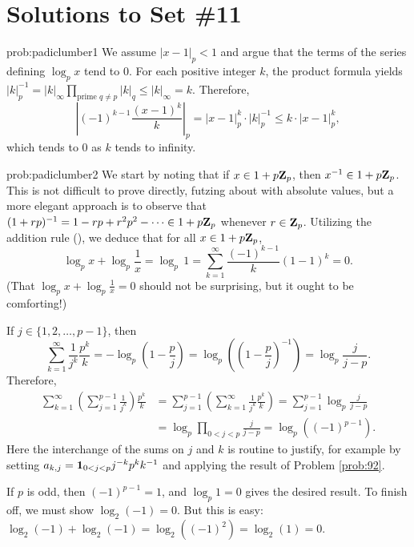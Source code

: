 \chapter*{Solutions to Set \#11}
\label{set10sols}

\begin{sol}{prob:padiclumber1} We assume $|x-1|_p < 1$ and argue that the terms of the series defining $\log_p x$ tend to $0$. For each positive integer $k$, the product formula yields $|k|_{p}^{-1} = |k|_\infty \prod_{\text{prime }q \ne p} |k|_{q} \le |k|_{\infty} = k$. Therefore,
\[ \left|(-1)^{k-1} \frac{(x-1)^k}{k}\right|_p = |x-1|_p^k \cdot |k|_p^{-1} \le k \cdot |x-1|_{p}^k, \]
which tends to $0$ as $k$ tends to infinity.
\end{sol}


\begin{sol}{prob:padiclumber2} We start by noting that if $x \in 1 + p\mathbf{Z}_p$, then $x^{-1} \in 1+p\mathbf{Z}_p$. This is not difficult to prove directly, futzing about with absolute values, but a more elegant approach is to observe that $(1+rp)^{-1} = 1 - rp + r^2p^2 - \dots \in 1+p\mathbf{Z}_p$ whenever $r \in \mathbf{Z}_p$. Utilizing the addition rule (\textdagger), we deduce that for all $x \in 1+p\mathbf{Z}_p$,
\[ \log_p x + \log_p \frac{1}{x} = \log_p\, 1 = \sum_{k=1}^{\infty} \frac{(-1)^{k-1}}{k}(1-1)^{k} = 0. \]
(That $\log_p x + \log_p \frac{1}{x}=0$ should not be surprising, but it ought to be comforting!)

If $j \in \{1,2,\dots,p-1\}$, then $$\sum_{k=1}^{\infty} \frac{1}{j^k} \frac{p^k}{k} = -\log_p\left(1-\frac{p}{j}\right) = \log_p\left(\left(1-\frac{p}{j}\right)^{-1}\right) = \log_p\frac{j}{j-p}.$$
Therefore, %
\begin{align*} \sum_{k=1}^{\infty} \left(\sum_{j=1}^{p-1} \frac{1}{j^k}\right)\frac{p^k}{k} &= \sum_{j=1}^{p-1} \left(\sum_{k=1}^{\infty} \frac{1}{j^k} \frac{p^k}{k}\right) = \sum_{j=1}^{p-1} \log_p \frac{j}{j-p} \\&= \log_p \prod_{0 < j < p}\frac{j}{j-p} = \log_p((-1)^{p-1}).
\end{align*} 
Here the interchange of the sums on $j$ and $k$ is routine to justify, for example by setting $a_{k,j} = \mathbf{1}_{0 < j < p} j^{-k} p^k k^{-1}$ and applying the result of Problem \ref{prob:92}.

If $p$ is odd, then $(-1)^{p-1}=1$, and $\log_p 1 = 0$ gives the desired result. To finish off, we must show $\log_2(-1)=0$. But this is easy: $\log_2(-1) + \log_2(-1) = \log_2((-1)^2) = \log_2(1) = 0$.
\end{sol}

